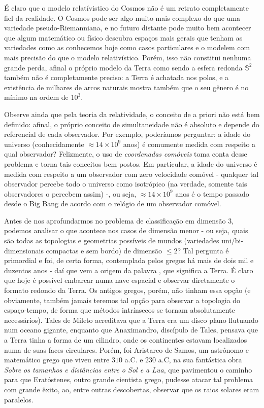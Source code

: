 É claro que o modelo relatívistico do Cosmos não é um retrato completamente fiel da realidade. O Cosmos pode ser algo muito mais complexo do que uma variedade pseudo-Riemanniana, e no futuro distante pode muito bem acontecer que algum matemático ou físico descubra espaços mais gerais que tenham as variedades como as conhecemos hoje como casos particulares e o modelem com mais precisão do que o modelo relativístico. Porém, isso não constitui nenhuma grande perda, afinal o próprio modelo da Terra como sendo a esfera redonda $\mathbb{S}^2$ também não é completamente preciso: a Terra é achatada nos polos, e a existência de milhares de arcos naturais mostra também que o seu gênero é no mínimo na ordem de $10^3$.\par
  Observe ainda que pela teoria da relatividade, o conceito de  a priori não está bem definido: afinal, o próprio conceito de simultaneidade não é absoluto e depende do referencial de cada observador. Por exemplo, poderíamos perguntar: a idade do universo (conhecidamente $\approx 14 \times 10^9$ anos) é comumente medida com respeito a qual observador? Felizmente, o uso de \emph{coordenadas comóveis} toma conta desse problema e torna tais conceitos bem postos. Em particular, a idade do universo é medida com respeito a um observador com zero velocidade comóvel - qualquer tal observador percebe todo o universo como isotrópico (na verdade, somente tais observadores o percebem assim) -, ou seja, $ \approx 14 \times 10^9$ anos é o tempo passado desde o Big Bang de acordo com o relógio de um observador comóvel. \par 
Antes de nos aprofundarmos no problema de classificação em dimensão $3$, podemos analisar o que acontece nos casos de dimensão menor - ou seja, quais são todas as topologias e geometrias possíveis de mundos (variedades uni/bi-dimensionais compactas e sem bordo) de dimensão $\leq 2$? Tal pergunta é primordial e foi, de certa forma, contemplada pelos gregos há mais de dois mil e duzentos anos - daí que vem a origem da palavra , que significa  a Terra. É claro que hoje é possível embarcar numa nave espacial e observar diretamente o formato redondo da Terra. Os antigos gregos, porém, não tinham essa opção (e obviamente, também jamais teremos tal opção para observar a topologia do espaço-tempo, de forma que métodos intrínsecos se tornam absolutamente necessários). Tales de Mileto acreditava que a Terra era um disco plano flutuando num oceano gigante, enquanto que Anaximandro, discípulo de Tales, pensava que a Terra tinha a forma de um cilindro, onde os continentes estavam localizados numa de suas faces circulares. Porém, foi Aristarco de Samos, um astrônomo e matemático grego que viveu entre $310$ a.C. e $230$ a.C, na sua fantástica obra \emph{Sobre os tamanhos e distâncias entre o Sol e a Lua}, que pavimentou o caminho para que Eratóstenes, outro grande cientista grego, pudesse atacar tal problema com grande êxito, ao, entre outras descobertas, observar que os raios solares eram paralelos. \par 
